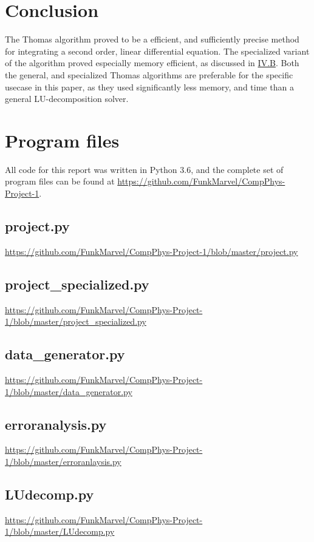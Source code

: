 \documentclass[english,notitlepage,reprint]{revtex4-1}  %
\begin{document}
\section{Conclusion}\label{sec:5}
The Thomas algorithm proved to be a efficient, and sufficiently precise method for integrating a second order, linear differential equation. The specialized variant of the algorithm proved especially memory efficient, as discussed in \hyperref[subsec:44]{IV.B}.
Both the general, and specialized Thomas algorithms are preferable for the specific usecase in this paper, as they used significantly less memory, and time than a general LU-decomposition solver.

{}
\newpage
\appendix
\section{Program files} \label{A}
All code for this report was written in Python 3.6, and the complete set of program files can be found at \url{https://github.com/FunkMarvel/CompPhys-Project-1}.

\subsection{project.py}\label{A:1}
\url{https://github.com/FunkMarvel/CompPhys-Project-1/blob/master/project.py}

\subsection{project\_specialized.py}\label{A:2}
\url{https://github.com/FunkMarvel/CompPhys-Project-1/blob/master/project_specialized.py}

\subsection{data\_generator.py} \label{A:3}
\url{https://github.com/FunkMarvel/CompPhys-Project-1/blob/master/data_generator.py}

\subsection{erroranalysis.py} \label{A:4}
\url{https://github.com/FunkMarvel/CompPhys-Project-1/blob/master/erroranlaysis.py}

\subsection{LUdecomp.py}\label{A:5}
\url{https://github.com/FunkMarvel/CompPhys-Project-1/blob/master/LUdecomp.py}
\end{document}
